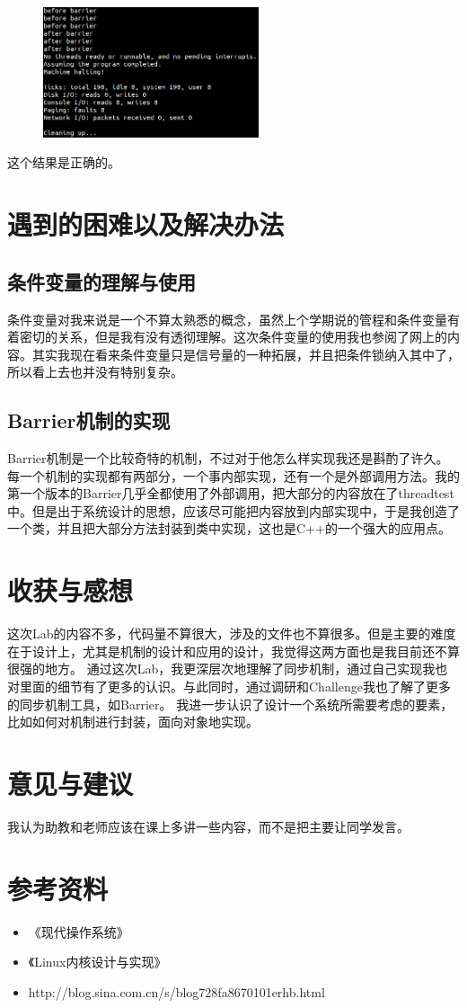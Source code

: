 \documentclass[nofonts]{ctexart}
\begin{document}
\begin{figure}[h!]
\includegraphics[width=2.5in]{e32.png}
\end{figure}

这个结果是正确的。

\section{遇到的困难以及解决办法}
\subsection*{条件变量的理解与使用}
条件变量对我来说是一个不算太熟悉的概念，虽然上个学期说的管程和条件变量有着密切的关系，但是我有没有透彻理解。这次条件变量的使用我也参阅了网上的内容。其实我现在看来条件变量只是信号量的一种拓展，并且把条件锁纳入其中了，所以看上去也并没有特别复杂。
\subsection*{Barrier机制的实现}
Barrier机制是一个比较奇特的机制，不过对于他怎么样实现我还是斟酌了许久。每一个机制的实现都有两部分，一个事内部实现，还有一个是外部调用方法。我的第一个版本的Barrier几乎全都使用了外部调用，把大部分的内容放在了threadtest中。但是出于系统设计的思想，应该尽可能把内容放到内部实现中，于是我创造了一个类，并且把大部分方法封装到类中实现，这也是C++的一个强大的应用点。

\section{收获与感想}

这次Lab的内容不多，代码量不算很大，涉及的文件也不算很多。但是主要的难度在于设计上，尤其是机制的设计和应用的设计，我觉得这两方面也是我目前还不算很强的地方。
通过这次Lab，我更深层次地理解了同步机制，通过自己实现我也对里面的细节有了更多的认识。与此同时，通过调研和Challenge我也了解了更多的同步机制工具，如Barrier。
我进一步认识了设计一个系统所需要考虑的要素，比如如何对机制进行封装，面向对象地实现。

\section{意见与建议}
我认为助教和老师应该在课上多讲一些内容，而不是把主要让同学发言。

\section{参考资料}
\begin{itemize}
\item 《现代操作系统》
\item 《Linux内核设计与实现》
\item  http://blog.sina.com.cn/s/blog728fa8670101erhb.html
\end{itemize}
\end{document}
